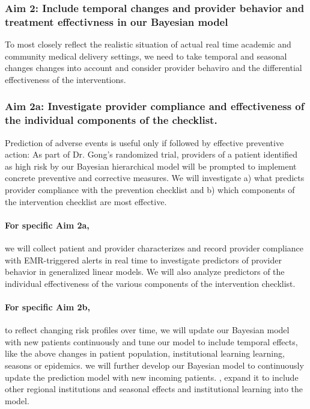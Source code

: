 \documentclass[11pt,notitlepage]{article}
\begin{document}
\subsubsection*{Aim 2: Include temporal changes and provider behavior and treatment effectivness in our Bayesian model}
To most closely reflect the realistic situation of actual real time academic and community medical delivery settings, we need to take temporal and seasonal changes changes into account and consider provider behaviro and the differential effectiveness of the interventions.

\subsubsection*{Aim 2a: Investigate provider compliance and effectiveness of the individual components of the checklist.}
Prediction of adverse events is useful only if followed by effective preventive action: As part of Dr. Gong's randomized trial, providers of a patient identified as high risk by our Bayesian hierarchical model will be prompted to implement concrete preventive and corrective measures. We will investigate a) what predicts provider compliance with the prevention checklist and b) which components of the intervention checklist are most effective.

\paragraph*{For specific Aim 2a,} we will collect patient and provider characterizes and record provider compliance with EMR-triggered alerts in real time to investigate predictors of provider behavior in generalized linear models. We will also analyze predictors of the individual effectiveness of the various components of the intervention checklist.

\paragraph*{For specific Aim 2b,} to reflect changing risk profiles over time, we will update our Bayesian model with new patients continuously and tune our model to include temporal effects, like the above changes in patient population, institutional learning learning, seasons or epidemics. we will further develop our Bayesian model to continuously update the prediction model with new incoming patients. , expand it to include other regional institutions and seasonal effects and institutional learning into the model.
\end{document}
